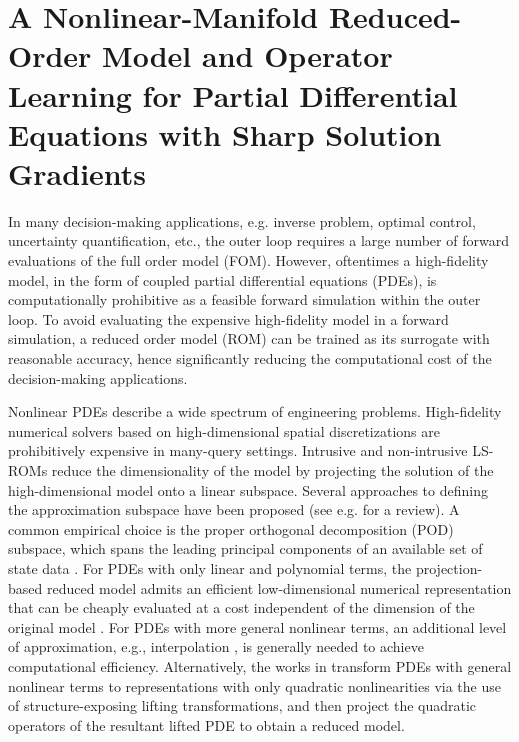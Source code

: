 \chapter{A Nonlinear-Manifold Reduced-Order Model and Operator Learning for Partial Differential Equations with Sharp Solution Gradients}
\label{chap:cnnae}

In many decision-making applications, e.g. inverse problem, optimal control, uncertainty quantification, etc., the outer loop requires a large number of forward evaluations of the full order model (FOM). However, oftentimes a high-fidelity model, in the form of coupled partial differential equations (PDEs), is computationally prohibitive as a feasible forward simulation within the outer loop. To avoid evaluating the expensive high-fidelity model in a forward simulation, a reduced order model (ROM) can be trained as its surrogate with reasonable accuracy, hence significantly reducing the computational cost of the decision-making applications.

Nonlinear PDEs describe a wide spectrum of engineering problems. High-fidelity numerical solvers based on high-dimensional spatial discretizations are prohibitively expensive in many-query settings. Intrusive and non-intrusive LS-ROMs reduce the dimensionality of the model by projecting the solution of the high-dimensional model onto a linear subspace. Several approaches to defining the approximation subspace have been proposed (see e.g. \cite{benner2015survey} for a review). A common empirical choice is the proper orthogonal decomposition (POD) subspace, which spans the leading principal components of an available set of state data \cite{berkooz1993proper,lumley1967structure,sirovich1987turbulence}.
For PDEs with only linear and polynomial terms, the projection-based reduced model admits an efficient low-dimensional numerical representation that can be cheaply evaluated at a cost independent of the dimension of the original model \cite{benner2015two,benner2015survey,cuong2005certified,goyal2016algebraic,hesthaven2016certified}. For PDEs with more general nonlinear terms, an additional level of approximation, e.g., interpolation \cite{astrid2008missing,barrault2004empirical,carlberg2013gnat,chaturantabut2010nonlinear,drmac2016new,grepl2007efficient,nguyen2008best}, is generally needed to achieve computational efficiency. Alternatively, the works in \cite{benner2015two,goyal2016algebraic,kramer2019nonlinear,kramer2019balanced} transform PDEs with general nonlinear terms to representations with only quadratic nonlinearities via the use of structure-exposing lifting transformations, and then project the quadratic operators of the resultant lifted PDE to obtain a reduced model.

